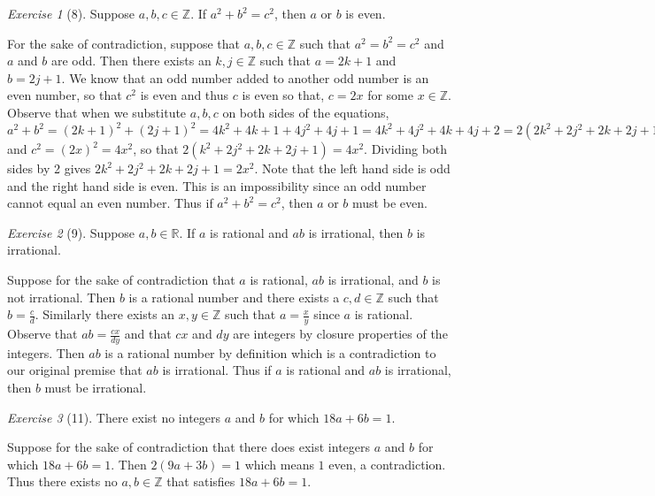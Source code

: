 \documentclass[12pt]{amsart}
\makeatletter
\theoremstyle{remark}
\newtheorem*{exercise}{Exercise}%
\def\RR{\ensuremath{\mathbb R}}
\def\ZZ{\ensuremath{\mathbb Z}}
\renewenvironment{proof}[1][\proofname]{\par\doublespacing
  \pushQED{\qed}%
  \normalfont \topsep6\p@\@plus6\p@\relax
  \list{}{%
    \settowidth{\leftmargin}{\itshape\proofname:\hskip\labelsep}%
    \setlength{\labelwidth}{0pt}%
    \setlength{\itemindent}{-\leftmargin}%
  }%
  \item[\hskip\labelsep\itshape#1\@addpunct{:}]\ignorespaces
}{%
  \popQED\endlist\@endpefalse
  \singlespacing
}
\theoremstyle{mycomment}
\makeatother
\begin{document}
\begin{exercise}[8] Suppose $a,b,c\in\ZZ$. If $a^{2}+b^{2}=c^{2}$, then $a$ or $b$ is even.
\begin{proof}
For the sake of contradiction, suppose that $a,b,c\in\ZZ$ such that $a^2=b^2=c^2$ and $a$ and $b$ are odd. Then there exists an $k,j\in\ZZ$ such that $a = 2k + 1$ and $b = 2j+1$. We know that an odd number added to another odd number is an even number, so that $c^2$ is even and thus $c$ is even so that, $c = 2x$ for some $x\in\ZZ$. Observe that when we substitute $a,b,c$ on both sides of the equations, $a^2 + b^2 = (2k+1)^2 + (2j+1)^2 = 4k^2 + 4k + 1 + 4j^2 + 4j + 1 = 4k^2 + 4j^2 + 4k + 4j + 2 = 2(2k^2 + 2j^2 + 2k + 2j + 1)$ and $c^2 = (2x)^2 = 4x^2$, so that $2(k^2 + 2j^2 + 2k + 2j + 1) = 4x^2$. Dividing both sides by 2 gives $2k^2 + 2j^2 + 2k + 2j + 1 = 2x^2$. Note that the left hand side is odd and the right hand side is even. This is an impossibility since an odd number cannot equal an even number. Thus if $a^2 + b^2=c^2$, then $a$ or $b$ must be even.
\end{proof}
\end{exercise}

\begin{exercise}[9] Suppose $a,b\in\RR$. If $a$ is rational and $ab$ is irrational, then $b$ is irrational.
\begin{proof}
  Suppose for the sake of contradiction that $a$ is rational, $ab$ is irrational, and $b$ is not irrational. Then $b$ is a rational number and there exists a $c,d \in \ZZ$ such that $b = \frac{c}{d}$. Similarly there exists an $x,y \in \ZZ$ such that $a = \frac{x}{y}$ since $a$ is rational. Observe that $ab = \frac{cx}{dy}$ and that $cx$ and $dy$ are integers by closure properties of the integers. Then $ab$ is a rational number by definition which
  is a contradiction to our original premise that $ab$ is irrational. Thus if $a$ is rational and $ab$ is irrational, then $b$ must be irrational.
\end{proof}
\end{exercise}

\begin{exercise}[11] There exist no integers $a$ and $b$ for which $18a+6b=1$.
\begin{proof}
Suppose for the sake of contradiction that there does exist integers $a$ and $b$ for which $18a + 6b = 1$.
Then $2(9a + 3b) = 1$ which means $1$ even, a contradiction. Thus there exists no $a,b\in\ZZ$ that satisfies $18a + 6b = 1$.
\end{proof}
\end{exercise}
\end{document}

